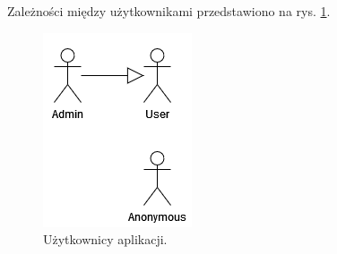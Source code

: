 \documentclass[a4paper,twoside,12pt]{book}
\begin{document}
Zależności między użytkownikami przedstawiono na rys. \ref{fig:uml-users}.

\begin{figure}
\centering
\includegraphics{./UML-Users.png}
\caption{Użytkownicy aplikacji.}
\label{fig:uml-users}
\end{figure}
\end{document}
